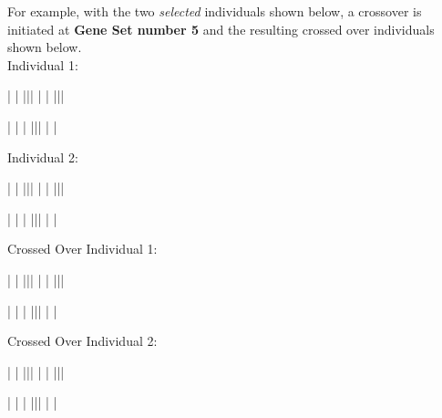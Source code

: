 \documentclass[ExampleMasters.tex]{subfiles}
\begin{document}
		For example, with the two \textit{selected} individuals shown below, a crossover is initiated at \textbf{Gene Set number 5} and the resulting crossed over individuals shown below.\\ 

		Individual 1:\\

			\centerline{\framebox{0} | \framebox{0} | \framebox{1} ||| \framebox{0}\framebox{1} | \framebox{0} |  |||} 
			\centerline{|  | \framebox{0} |  ||| \framebox{0} \framebox{1} | \framebox{0} | }
			\vspace{0.1in}

		Individual 2:\\

			\centerline{\framebox{0} |  | \framebox{1} ||| \framebox{0} |  | \framebox{1} |||} 
			\centerline{|  | \framebox{0} | \framebox{1} ||| \framebox{0} \framebox{1} | \framebox{0} | \framebox{0}}
			\vspace{0.1in}

		Crossed Over Individual 1:\\

			\centerline{\framebox{0} |  | \framebox{1} ||| \framebox{0}\framebox{1} | \framebox{0} | \framebox{1} |||} 
			\centerline{|  | \framebox{0} | \framebox{1} ||| \framebox{0} \framebox{1} | \framebox{0} | \framebox{0}}
			\vspace{0.1in}

		Crossed Over Individual 2:\\

			\centerline{ |  | \framebox{1} ||| \framebox{0} | \framebox{0} | \framebox{1} |||} 
			\centerline{|  | \framebox{0} |  ||| \framebox{0} \framebox{1} | \framebox{0} | }
			\vspace{0.1in}
\end{document}
